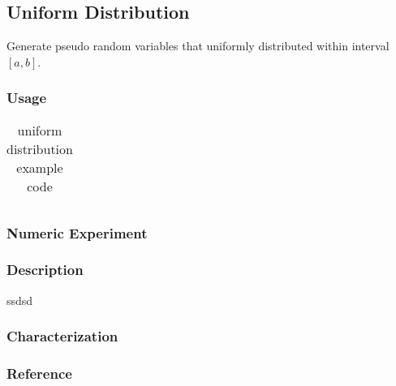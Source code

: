 \subsection{Uniform Distribution}

Generate pseudo random variables that uniformly distributed within interval $[a,b]$.

\subsubsection{Usage}
 
\begin{small}
\begin{ttfamily}

\begin{center}
\begin{longtable}{|l|}
\caption{uniform distribution example code} \\
\hline 

\hline
\end{longtable}
\end{center}
\end{ttfamily}
\end{small}





\subsubsection{Numeric Experiment}


\subsubsection{Description}

ssdsd

\subsubsection{Characterization}

\subsubsection{Reference}
